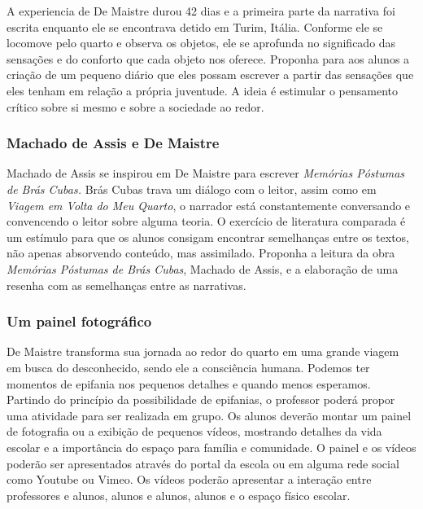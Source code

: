 \documentclass[12pt]{extarticle}
\begin{document}
A experiencia de De Maistre durou 42 dias e a primeira parte da
narrativa foi escrita enquanto ele se encontrava detido em Turim,
Itália. Conforme ele se locomove pelo quarto e observa os objetos, ele
se aprofunda no significado das sensações e do conforto que cada
objeto nos oferece. Proponha para aos alunos a criação de um pequeno
diário que eles possam escrever a partir das sensações que eles tenham
em relação a própria juventude. A ideia é estimular o pensamento
crítico sobre si mesmo e sobre a sociedade ao redor.

\subsubsection{Machado de Assis e De Maistre}

Machado de Assis se inspirou em De Maistre para escrever
\emph{Memórias Póstumas de Brás Cubas.} Brás Cubas trava um diálogo com
o leitor, assim como em \emph{Viagem em Volta do Meu Quarto}, o
narrador está constantemente conversando e convencendo o leitor sobre
alguma teoria. O exercício de literatura comparada é um estímulo para
que os alunos consigam encontrar semelhanças entre os textos, não
apenas absorvendo conteúdo, mas assimilado. Proponha a leitura da obra
\textit{Memórias Póstumas de Brás Cubas}, Machado de Assis, e a
elaboração de uma resenha com as semelhanças entre as narrativas.

\subsubsection{Um painel fotográfico}


De Maistre transforma sua jornada ao redor do quarto em uma grande
viagem em busca do desconhecido, sendo ele a consciência humana.
Podemos ter momentos de epifania nos pequenos detalhes e quando menos
esperamos. Partindo do princípio da possibilidade de epifanias, o
professor poderá propor uma atividade para ser realizada em grupo. Os
alunos deverão montar um painel de fotografia ou a exibição de
pequenos vídeos, mostrando detalhes da vida escolar e a importância do
espaço para família e comunidade. O painel e os vídeos poderão ser
apresentados através do portal da escola ou em alguma rede social 
como Youtube ou Vimeo. Os vídeos poderão
apresentar a interação entre professores e alunos, alunos e alunos,
alunos e o espaço físico escolar.

\end{document}
